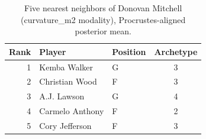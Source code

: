 \begin{table}[htbp]
  \centering\small
  \begin{tabular}{rllc}
    \toprule
    Rank & Player & Position & Archetype \\
    \midrule
    1 & Kemba Walker & G & 3 \\
    2 & Christian Wood & F & 3 \\
    3 & A.J. Lawson & G & 4 \\
    4 & Carmelo Anthony & F & 2 \\
    5 & Cory Jefferson & F & 3 \\
    \bottomrule
  \end{tabular}
  \caption{Five nearest neighbors of Donovan Mitchell (curvature_m2 modality), Procrustes-aligned posterior mean.}
  \label{tab:Donovan_Mitchell_neighbors_curvature_m2}
\end{table}

